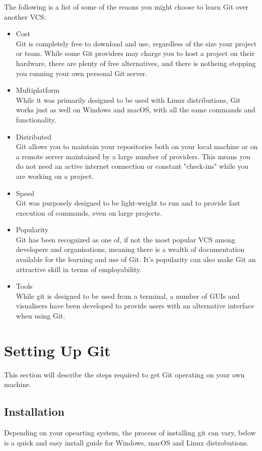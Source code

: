 \documentclass[11pt, a4paper, draft, titlepage]{article}
\begin{document}
The following is a list of some of the reaons you might choose to learn Git
over another VCS:
\begin{itemize} 
\item Cost \\
Git is completely free to download and use, regardless of the size your
project or team.  
While some Git providers may charge you to host a project on
their hardware, there are plenty of free alternatives, and there is notheing
stopping you running your own personal Git server.  
\item Multiplatform \\ 
While it was primarily designed to be used with Linux distributions, Git works
just as well on Windows and macOS, with all the same commands and functionality.
\item Distributed \\ 
Git allows you to maintain your repositories both on your local machine or on
a remote server maintained by a large number of providers. 
This means you do not need an active internet connection or constant
"check-ins" while you are working on a project.
\item Speed \\
Git was purposely designed to be light-weight to run and to provide fast
execution of commands, even on large projects.
\item Popularity \\ 
Git has been recognized as one of, if not the most popular VCS among
developers and organisations, meaning there is a wealth of documentation
available for the learning and use of Git. 
It's popularity can also make Git an attractive skill in terms of
employability.
\item Tools \\
While git is designed to be used from a terminal, a number of GUIs and
visualisers have been developed to provide users with an alternative interface
when using Git.
\end{itemize}



\section{Setting Up Git}
This section will describe the steps required to get Git operating on your own
machine. 


\subsection{Installation}
Depending on your opearting system, the process of installing git can vary,
below is a quick and easy install guide for Windows, macOS and Linux
distrobutions.
\end{document}
